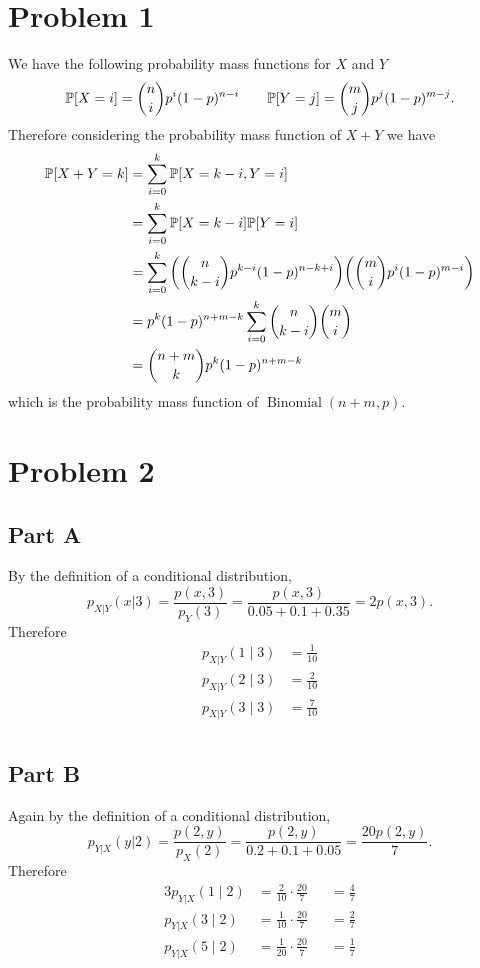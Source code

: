 \documentclass{eeleyes}
\begin{document}
\section*{Problem 1}
We have the following probability mass functions for $X$ and $Y$
\[
    \mathbb{P}\qty[X = i] = \binom{n}{i} p^i (1-p)^{n - i} \qquad \mathbb{P}\qty[Y = j] = \binom{m}{j} p^j (1-p)^{m - j}
.\]
Therefore considering the probability mass function of $X + Y$ we have
\begin{align*}
    \mathbb{P}\qty[X + Y = k] &= \sum_{i = 0}^k \mathbb{P}\qty[X = k - i, Y = i] \\
                     &= \sum_{i = 0}^k \mathbb{P}\qty[X = k - i] \mathbb{P}\qty[Y = i] \\
                     &= \sum_{i = 0}^k \qty(\binom{n}{k-i} p^{k-i} (1-p)^{n-k+i}) \qty(\binom{m}{i} p^i (1-p)^{m-i}) \\
                     &= p^k (1-p)^{n+m-k}  \sum_{i = 0}^k \binom{n}{k-i} \binom{m}{i} \\
                     &= \binom{n+m}{k} p^k (1-p)^{n+m-k}
\end{align*}
which is the probability mass function of $\operatorname{Binomial}(n+m, p)$.


\section*{Problem 2}
\subsection*{Part A}
By the definition of a conditional distribution,
\[
    p_{X | Y}(x | 3) = \frac{p(x,3)}{p_{Y}(3)} = \frac{p(x,3)}{0.05 + 0.1 + 0.35} = 2 p(x,3)
.\]
Therefore
\begin{align*}
    p_{X | Y}(1 \mid 3) &= \frac{1}{10} \\
    p_{X | Y}(2 \mid 3) &= \frac{2}{10} \\
    p_{X | Y}(3 \mid 3) &= \frac{7}{10} \\
\end{align*}

\subsection*{Part B}
Again by the definition of a conditional distribution,
\[
    p_{Y | X}(y | 2) = \frac{p(2,y)}{p_{X}(2)} = \frac{p(2,y)}{0.2 + 0.1 + 0.05} = \frac{20 p(2,y)}{7}
.\]
Therefore
\begin{alignat*}{3}
    p_{Y | X}(1 \mid 2) &= \frac{2}{10} \cdot \frac{20}{7} &&= \frac{4}{7} \\
    p_{Y | X}(3 \mid 2) &= \frac{1}{10} \cdot \frac{20}{7} &&= \frac{2}{7} \\
    p_{Y | X}(5 \mid 2) &= \frac{1}{20} \cdot \frac{20}{7} &&= \frac{1}{7}
\end{alignat*}
\end{document}
